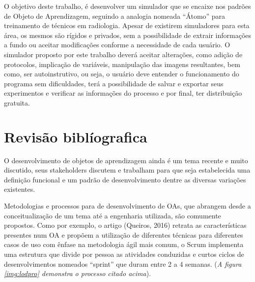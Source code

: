\documentclass[12pt,openright,oneside,a4paper,english,french,spanish,brazil]{unifil}
\begin{document}
\par O objetivo deste trabalho, é desenvolver um simulador que se encaixe nos padrões de Objeto de Aprendizagem, seguindo a analogia nomeada ``Átomo'' para treinamento de técnicos em radiologia. Apesar de existirem simuladores para esta área, os mesmos são rígidos e privados, sem a possibilidade de extrair informações a fundo ou aceitar modificações conforme a necessidade de cada usuário. O simulador proposto por este trabalho deverá aceitar alterações, como adição de protocolos, implicação de variáveis, manipulação das imagens resultantes, bem como, ser autoinstrutivo, ou seja, o usuário deve entender o funcionamento do programa sem dificuldades, terá a possibilidade de salvar e exportar seus experimentos e verificar as informações do processo e por final, ter distribuição gratuita.

\chapter{Revisão biblíografica}%

O desenvolvimento de objetos de aprendizagem ainda é um tema recente e muito discutido, seus stakeholders  discutem e trabalham para que seja estabelecida uma definição funcional e um padrão de desenvolvimento dentre  as diversas variações existentes. 
\par Metodologias e processos para de desenvolvimento de OAs, que abrangem desde a conceitualização de um tema até a engenharia utilizada, são comumente propostos. Como por exemplo, o artigo (Queiros, 2016) retrata as características presentes num OA e propõem a utilização de diferentes técnicas para diferentes casos de uso com ênfase na metodologia ágil mais comum, o Scrum implementa uma estrutura que divide por pessoa as atividades conduzidas e curtos ciclos de desenvolvimentos nomeados ``sprint'' que duram entre 2 a 4 semanas. (\textit{A figura \ref{img:lodpro} demonstra o processo citado acima}).
\end{document}
